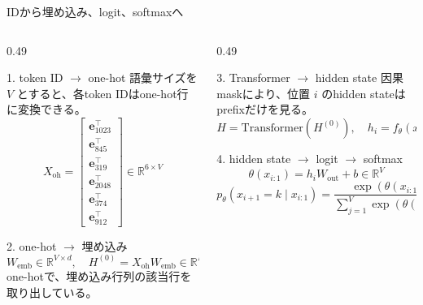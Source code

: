 \documentclass[dvipdfmx,uplatex,unicode,9pt,aspectratio=169]{beamer}
\begin{document}
\begin{frame}{IDから埋め込み、logit、softmaxへ}
\small
\begin{columns}[T,onlytextwidth]
\begin{column}{0.49\linewidth}
\begin{block}{1. token ID $\rightarrow$ one-hot}
語彙サイズを $V$ とすると、各token IDはone-hot行に変換できる。
\[
X_{\mathrm{oh}}=
\begin{bmatrix}
\bm e_{1023}^{\top}\\
\bm e_{845}^{\top}\\
\bm e_{319}^{\top}\\
\bm e_{2048}^{\top}\\
\bm e_{374}^{\top}\\
\bm e_{912}^{\top}
\end{bmatrix}
\in\mathbb{R}^{6\times V}
\]
\end{block}
\begin{block}{2. one-hot $\rightarrow$ 埋め込み}
\[
W_{\mathrm{emb}}\in\mathbb{R}^{V\times d},\quad
H^{(0)}=X_{\mathrm{oh}}W_{\mathrm{emb}}\in\mathbb{R}^{N\times d}.
\]
one-hotで、埋め込み行列の該当行を取り出している。
\end{block}
\end{column}
\begin{column}{0.49\linewidth}
\begin{block}{3. Transformer $\rightarrow$ hidden state}
因果maskにより、位置 $i$ のhidden stateはprefixだけを見る。
\[
H=\mathrm{Transformer}(H^{(0)}),\quad h_i=f_\theta(x_{i:1}).
\]
\end{block}
\begin{block}{4. hidden state $\rightarrow$ logit $\rightarrow$ softmax}
\[
\theta(x_{i:1})=h_iW_{\mathrm{out}}+b\in\mathbb{R}^{V}
\]
\[
p_\theta(x_{i+1}=k\mid x_{i:1})
=\frac{\exp(\theta(x_{i:1})[k])}
{\sum_{j=1}^{V}\exp(\theta(x_{i:1})[j])}.
\]
\end{block}
\end{column}
\end{columns}
\end{frame}
\end{document}
